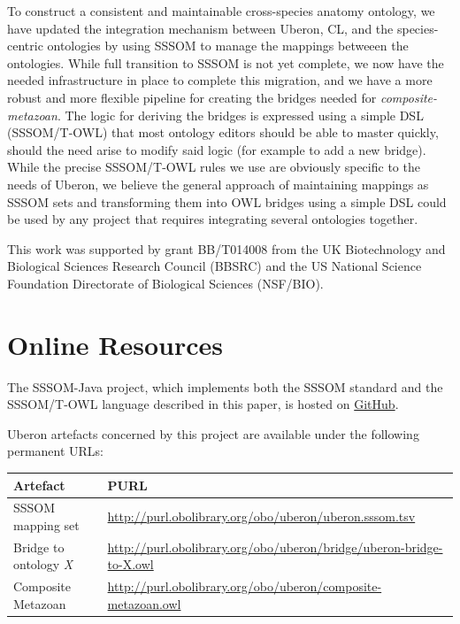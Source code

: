 \documentclass{ceurart}
\begin{document}
To construct a consistent and maintainable cross-species anatomy
ontology, we have updated the integration mechanism between Uberon, CL,
and the species-centric ontologies by using SSSOM to manage the mappings
betweeen the ontologies. While full transition to SSSOM is not yet
complete, we now have the needed infrastructure in place to complete
this migration, and we have a more robust and more flexible pipeline for
creating the bridges needed for \emph{composite-metazoan}. The logic for
deriving the bridges is expressed using a simple DSL (SSSOM/T-OWL) that
most ontology editors should be able to master quickly, should the need
arise to modify said logic (for example to add a new bridge). While the
precise SSSOM/T-OWL rules we use are obviously specific to the needs of
Uberon, we believe the general approach of maintaining mappings as SSSOM
sets and transforming them into OWL bridges using a simple DSL could be
used by any project that requires integrating several ontologies
together.

\begin{acknowledgments}
This work was supported by grant BB/T014008 from the UK Biotechnology
and Biological Sciences Research Council (BBSRC) and the US National
Science Foundation Directorate of Biological Sciences (NSF/BIO).
\end{acknowledgments}



\appendix

\section{Online Resources}

The SSSOM-Java project, which implements both the SSSOM standard and the
SSSOM/T-OWL language described in this paper, is hosted on
\href{https://github.com/gouttegd/sssom-java/}{GitHub}.

Uberon artefacts concerned by this project are available under the
following permanent URLs:

\begin{tabular}{ll}
\hline
Artefact & PURL\\
\hline
SSSOM mapping set & \url{http://purl.obolibrary.org/obo/uberon/uberon.sssom.tsv}\\
Bridge to ontology \emph{X} & \url{http://purl.obolibrary.org/obo/uberon/bridge/uberon-bridge-to-X.owl}\\
Composite Metazoan & \url{http://purl.obolibrary.org/obo/uberon/composite-metazoan.owl}\\
\hline
\end{tabular}
\end{document}
